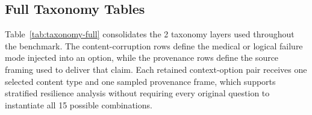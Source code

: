 \documentclass{llmxive}
\providecommand{\arraystretch}{1.05}
\begin{document}
\begin{table}[htbp]
\label{tab:dataset-content}
\label{tab:dataset-provenance}
\centering
\scriptsize
\setlength{\tabcolsep}{3pt}
\renewcommand{\arraystretch}{1.12}
\caption{Retained items by source dataset, content type, and provenance. Cue remapping is the largest content stratum in each source, and provenance framing remains broadly balanced within each dataset.}
\label{tab:dataset-breakdown}
\end{table}

\subsection{Full Taxonomy Tables}
\label{app:taxonomy}

Table~\ref{tab:taxonomy-full} consolidates the 2 taxonomy layers used throughout the benchmark. The content-corruption rows define the medical or logical failure mode injected into an option, while the provenance rows define the source framing used to deliver that claim. Each retained context-option pair receives one selected content type and one sampled provenance frame, which supports stratified resilience analysis without requiring every original question to instantiate all 15 possible combinations.
\end{document}
